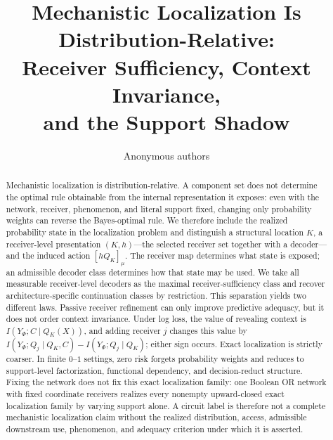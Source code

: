 \documentclass{article}
\title{Mechanistic Localization Is\\
Distribution-Relative:\\
Receiver Sufficiency, Context Invariance,\\
and the Support Shadow}
\author{Anonymous authors}
\begin{document}
\maketitle

\begin{abstract}
Mechanistic localization is distribution-relative. A component set does not determine the optimal rule obtainable from the internal representation it exposes: even with the network, receiver, phenomenon, and literal support fixed, changing only probability weights can reverse the Bayes-optimal rule. We therefore include the realized probability state in the localization problem and distinguish a structural location $K$, a receiver-level presentation $(K,h)$---the selected receiver set together with a decoder---and the induced action $[hQ_K]_\mu$. The receiver map determines what state is exposed; an admissible decoder class determines how that state may be used. We take all measurable receiver-level decoders as the maximal receiver-sufficiency class and recover architecture-specific continuation classes by restriction. This separation yields two different laws. Passive receiver refinement can only improve predictive adequacy, but it does not order context invariance. Under log loss, the value of revealing context is $I(Y_\Phi;C\mid Q_K(X))$, and adding receiver $j$ changes this value by $I(Y_\Phi;Q_j\mid Q_K,C)-I(Y_\Phi;Q_j\mid Q_K)$; either sign occurs. Exact localization is strictly coarser. In finite $0$--$1$ settings, zero risk forgets probability weights and reduces to support-level factorization, functional dependency, and decision-reduct structure. Fixing the network does not fix this exact localization family: one Boolean OR network with fixed coordinate receivers realizes every nonempty upward-closed exact localization family by varying support alone. A circuit label is therefore not a complete mechanistic localization claim without the realized distribution, access, admissible downstream use, phenomenon, and adequacy criterion under which it is asserted.
\end{abstract}






\end{document}
